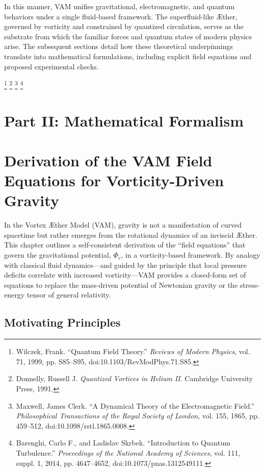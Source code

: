 \documentclass[aps,preprint,superscriptaddress]{revtex4-2}
\begin{document}
    In this manner, VAM unifies gravitational, electromagnetic, and quantum behaviors under a single fluid-based framework. The superfluid-like Æther, governed by vorticity and constrained by quantized circulation, serves as the substrate from which the familiar forces and quantum states of modern physics arise. The subsequent sections detail how these theoretical underpinnings translate into mathematical formulations, including explicit field equations and proposed experimental checks.

    \footnote{Wilczek, Frank. “Quantum Field Theory.” \textit{Reviews of Modern Physics}, vol. 71, 1999, pp. S85–S95, doi:10.1103/RevModPhys.71.S85.}
    \footnote{Donnelly, Russell J. \textit{Quantized Vortices in Helium II}. Cambridge University Press, 1991.}
    \footnote{Maxwell, James Clerk. “A Dynamical Theory of the Electromagnetic Field.” \textit{Philosophical Transactions of the Royal Society of London}, vol. 155, 1865, pp. 459–512, doi:10.1098/rstl.1865.0008.}
    \footnote{Barenghi, Carlo F., and Ladislav Skrbek. “Introduction to Quantum Turbulence.” \textit{Proceedings of the National Academy of Sciences}, vol. 111, suppl. 1, 2014, pp. 4647–4652, doi:10.1073/pnas.1312549111.}


    \section*{Part II: Mathematical Formalism}\label{sec:part-2}


    \section{Derivation of the VAM Field Equations for Vorticity-Driven Gravity}

    In the Vortex Æther Model (VAM), gravity is not a manifestation of curved spacetime but rather emerges from the rotational dynamics of an inviscid Æther. This chapter outlines a self-consistent derivation of the “field equations” that govern the gravitational potential, \(\Phi_v\), in a vorticity-based framework. By analogy with classical fluid dynamics—and guided by the principle that local pressure deficits correlate with increased vorticity—VAM provides a closed-form set of equations to replace the mass-driven potential of Newtonian gravity or the stress-energy tensor of general relativity.

    \subsection{Motivating Principles}
\end{document}
